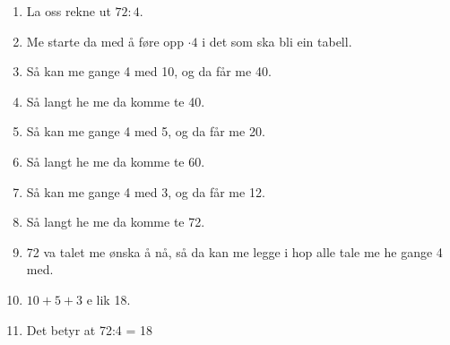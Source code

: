 \documentclass{article}
\begin{document}
\begin{enumerate}
\item La oss rekne ut $ 72:4 $.
\item Me starte da med å føre opp $ \cdot 4 $ i det som ska bli ein tabell.
\item Så kan me gange 4 med 10, og da får me 40.
\item  Så langt he me da komme te 40.
\item Så kan me gange 4 med 5, og da får me 20.
\item Så langt he me da komme te 60.
\item Så kan me gange 4 med 3, og da får me 12.
\item Så langt he me da komme te 72.
\item 72 va talet me ønska å nå, så da kan me legge i hop alle tale me he gange 4 med.
\item $ 10+5+3$ e lik 18. 
\item Det betyr at 72:4 = 18
\end{enumerate}
\end{document}
